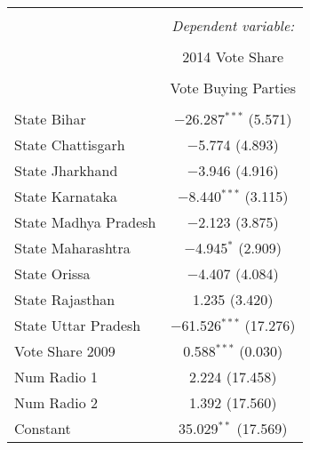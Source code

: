 
\begin{table}[!htbp] \centering 
  \caption{} 
  \label{} 
\begin{tabular}{@{\extracolsep{5pt}}lc} 
\\[-1.8ex]\hline 
\hline \\[-1.8ex] 
 & \multicolumn{1}{c}{\textit{Dependent variable:}} \\ 
\cline{2-2} 
\\[-1.8ex] & 2014 Vote Share \\ 
\\[-1.8ex] & Vote Buying Parties \\ 
\hline \\[-1.8ex] 
  State Bihar & $-$26.287$^{***}$ (5.571) \\ 
  State Chattisgarh & $-$5.774 (4.893) \\ 
  State Jharkhand & $-$3.946 (4.916) \\ 
  State Karnataka & $-$8.440$^{***}$ (3.115) \\ 
  State Madhya Pradesh & $-$2.123 (3.875) \\ 
  State Maharashtra & $-$4.945$^{*}$ (2.909) \\ 
  State Orissa & $-$4.407 (4.084) \\ 
  State Rajasthan & 1.235 (3.420) \\ 
  State Uttar Pradesh & $-$61.526$^{***}$ (17.276) \\ 
  Vote Share 2009 & 0.588$^{***}$ (0.030) \\ 
  Num Radio 1 & 2.224 (17.458) \\ 
  Num Radio 2 & 1.392 (17.560) \\ 
  Constant & 35.029$^{**}$ (17.569) \\ 
 \hline 
\end{tabular} 
\end{table} 
